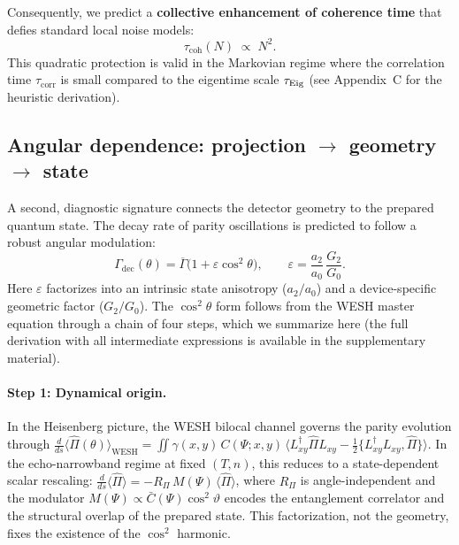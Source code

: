 \documentclass[12pt,a4paper]{article}
\numberwithin{equation}{section}
\begin{document}
Consequently, we predict a \textbf{collective enhancement of coherence time} that defies standard local noise models:
\begin{equation}
\tau_{\mathrm{coh}}(N)\;\propto\;N^2. 
\label{eq:coherence-enhancement}
\end{equation}
This quadratic protection is valid in the Markovian regime where the correlation time $\tau_{\mathrm{corr}}$ is small compared to the eigentime scale $\tau_{\rm Eig}$ (see Appendix~C for the heuristic derivation).
\vspace{0.5cm}

\subsection{Angular dependence: projection $\to$ geometry $\to$ state}
\label{subsec:ang-bridge}
\vspace{0.3cm}

A second, diagnostic signature connects the detector geometry to the prepared quantum state. The decay rate of parity oscillations is predicted to follow a robust angular modulation:
\begin{equation}
\Gamma_{\mathrm{dec}}(\theta)=\overline\Gamma\big(1+\varepsilon\cos^2\theta\big),
\qquad
\varepsilon=\frac{a_2}{a_0}\,\frac{G_2}{G_0}.
\label{eq:angular-law}
\end{equation}
Here $\varepsilon$ factorizes into an intrinsic state anisotropy ($a_2/a_0$) and a device-specific geometric factor ($G_2/G_0$). The $\cos^2\theta$ form follows from the WESH master equation through a chain of four steps, which we summarize here (the full derivation with all intermediate expressions is available in the supplementary material).

\paragraph{Step 1: Dynamical origin.}
In the Heisenberg picture, the WESH bilocal channel governs the parity evolution through $\frac{d}{ds}\langle\hat\Pi(\theta)\rangle_{\mathrm{WESH}} = \iint \gamma(x,y)\,C(\Psi;x,y)\,\langle L_{xy}^\dagger\hat\Pi L_{xy} - \tfrac{1}{2}\{L_{xy}^\dagger L_{xy},\hat\Pi\}\rangle$. In the echo-narrowband regime at fixed $(T,n)$, this reduces to a state-dependent scalar rescaling: $\frac{d}{ds}\langle\hat\Pi\rangle = -R_\Pi\,M(\Psi)\,\langle\hat\Pi\rangle$, where $R_\Pi$ is angle-independent and the modulator $M(\Psi)\propto\bar{C}(\Psi)\cos^2\vartheta$ encodes the entanglement correlator and the structural overlap of the prepared state. This factorization, not the geometry, fixes the existence of the $\cos^2$ harmonic.
\end{document}
